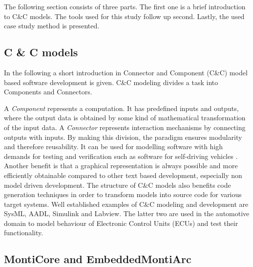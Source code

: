 The following section consists of three parts. The first one is a brief introduction to C\&C models. The tools used for this study follow up second. Lastly, the used case study method is presented.

\subsection{C \& C models}

In the following a short introduction in Connector and Component (C\&C) model based software development is given. C\&C modeling divides a task into Components and Connectors.

A \emph{Component} represents a computation. It has predefined inputs and outputs, where the output data is obtained by some kind of mathematical transformation of the input data. A \emph{Connector} represents interaction mechanisms by connecting outputs with inputs. By making this division, the paradigm ensures modularity and therefore reusability.
It can be used for modelling software with high demands for testing and verification such as software for self-driving vehicles \cite{WencksternCCViP}\cite{WencksternSimFrame}.
Another benefit is that a graphical representation is always possible and more efficiently obtainable compared to other text based development, especially non model driven development. The structure of C\&C models also benefits code generation techniques in order to transform models into source code for various target systems.
Well established examples of C\&C modeling and development are SysML\cite{sysml}, AADL\cite{aadl}, Simulink\cite{simulink} and Labview\cite{labview}. The latter two are used in the automotive domain to model behaviour of Electronic Control Units (ECUs) and test their functionality.

\subsection{MontiCore and EmbeddedMontiArc}

